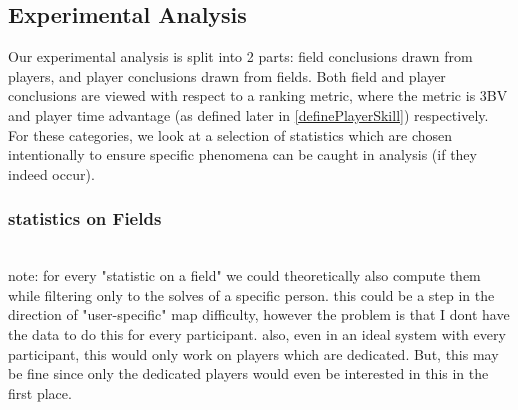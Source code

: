 \subsection{Experimental Analysis}
    Our experimental analysis is split into 2 parts: field conclusions drawn from players, and player conclusions drawn from fields.
    Both field and player conclusions are viewed with respect to a ranking metric, where the metric is 3BV and player time advantage (as defined later in \ref{definePlayerSkill}) respectively.
    For these categories, we look at a selection of statistics which are chosen intentionally to ensure specific phenomena can be caught in analysis (if they indeed occur).
    
    \subsubsection{\textbf{statistics on Fields}} \hfill \\
        note: for every "statistic on a field" we could theoretically also compute them while filtering only to the solves of a specific person.
        this could be a step in the direction of "user-specific" map difficulty,
        however the problem is that I dont have the data to do this for every participant.
        also, even in an ideal system with every participant, this would only work on players which are dedicated. But, this may be fine since only the dedicated players would even be interested in this in the first place.

